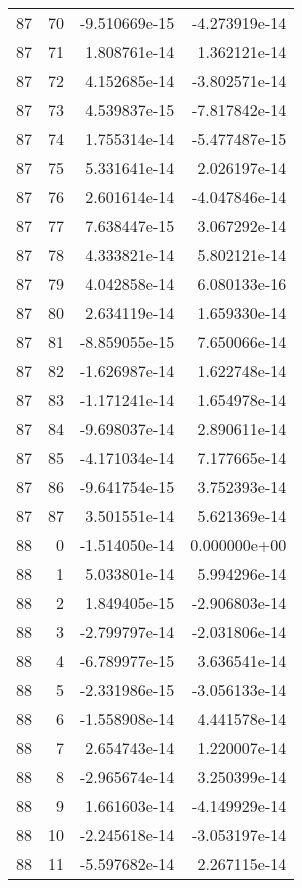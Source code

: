 \begin{tabular}{rrrr}
  87 &   70 & -9.510669e-15 & -4.273919e-14 \\
  87 &   71 &  1.808761e-14 &  1.362121e-14 \\
  87 &   72 &  4.152685e-14 & -3.802571e-14 \\
  87 &   73 &  4.539837e-15 & -7.817842e-14 \\
  87 &   74 &  1.755314e-14 & -5.477487e-15 \\
  87 &   75 &  5.331641e-14 &  2.026197e-14 \\
  87 &   76 &  2.601614e-14 & -4.047846e-14 \\
  87 &   77 &  7.638447e-15 &  3.067292e-14 \\
  87 &   78 &  4.333821e-14 &  5.802121e-14 \\
  87 &   79 &  4.042858e-14 &  6.080133e-16 \\
  87 &   80 &  2.634119e-14 &  1.659330e-14 \\
  87 &   81 & -8.859055e-15 &  7.650066e-14 \\
  87 &   82 & -1.626987e-14 &  1.622748e-14 \\
  87 &   83 & -1.171241e-14 &  1.654978e-14 \\
  87 &   84 & -9.698037e-14 &  2.890611e-14 \\
  87 &   85 & -4.171034e-14 &  7.177665e-14 \\
  87 &   86 & -9.641754e-15 &  3.752393e-14 \\
  87 &   87 &  3.501551e-14 &  5.621369e-14 \\
  88 &    0 & -1.514050e-14 &  0.000000e+00 \\
  88 &    1 &  5.033801e-14 &  5.994296e-14 \\
  88 &    2 &  1.849405e-15 & -2.906803e-14 \\
  88 &    3 & -2.799797e-14 & -2.031806e-14 \\
  88 &    4 & -6.789977e-15 &  3.636541e-14 \\
  88 &    5 & -2.331986e-15 & -3.056133e-14 \\
  88 &    6 & -1.558908e-14 &  4.441578e-14 \\
  88 &    7 &  2.654743e-14 &  1.220007e-14 \\
  88 &    8 & -2.965674e-14 &  3.250399e-14 \\
  88 &    9 &  1.661603e-14 & -4.149929e-14 \\
  88 &   10 & -2.245618e-14 & -3.053197e-14 \\
  88 &   11 & -5.597682e-14 &  2.267115e-14 \\

\end{tabular}
